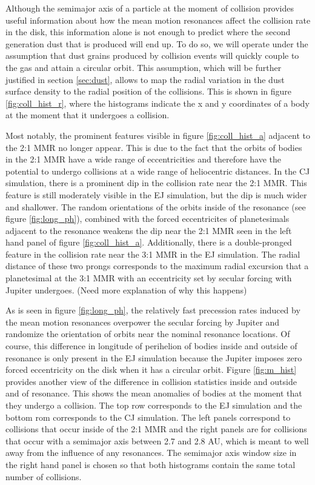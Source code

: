 \documentclass[twocolumn]{aastex63}
\begin{document}
Although the semimajor axis of a particle at the moment of collision provides useful information about how the mean motion 
resonances affect the collision rate in the disk, this information alone is not enough to predict where the second generation dust that 
is produced will end up. To do so, we will operate under the assumption that dust grains produced by collision events will quickly 
couple to the gas and attain a circular orbit. This assumption, which will be further justified in section \ref{sec:dust}, allows to map the 
radial variation in the dust surface density to the radial position of the collisions. This is shown in figure \ref{fig:coll_hist_r}, where the 
histograms indicate the x and y coordinates of a body at the moment that it undergoes a collision.

Most notably, the prominent features visible in figure \ref{fig:coll_hist_a} adjacent to the 2:1 MMR no longer appear. This is due to the 
fact that the orbits of bodies in the 2:1 MMR have a wide range of eccentricities and therefore have the potential to undergo 
collisions at a wide range of heliocentric distances. In the CJ simulation, there is a prominent dip in the collision rate near the 2:1 
MMR. This feature is still moderately visible in the EJ simulation, but the dip is much wider and shallower. The random orientations of 
the orbits inside of the resonance (see figure \ref{fig:long_ph}), combined with the forced eccentricites of planetesimals adjacent to 
the resonance weakens the dip near the 2:1 MMR seen in the left hand panel of figure \ref{fig:coll_hist_a}. Additionally, there is a 
double-pronged feature in the collision rate near the 3:1 MMR in the EJ simulation. The radial distance of these two prongs 
corresponds to the maximum radial excursion that a planetesimal at the 3:1 MMR with an eccentricity set by secular forcing with 
Jupiter undergoes. (Need more explanation of why this happens)

As is seen in figure \ref{fig:long_ph}, the relatively fast precession rates induced by the mean motion resonances overpower the 
secular forcing by Jupiter and randomize the orientation of orbits near the nominal resonance locations. Of course, this difference in 
longitude of perihelion of bodies inside and outside of resonance is only present in the EJ simulation because the Jupiter imposes 
zero forced eccentricity on the disk when it has a circular orbit. Figure \ref{fig:m_hist} provides another view of the difference in 
collision statistics inside and outside and of resonance. This shows the mean anomalies of bodies at the moment that they undergo a 
collision. The top row corresponds to the EJ simulation and the bottom rom corresponds to the CJ simulation. The left panels 
correspond to collisions that occur inside of the 2:1 MMR and the right panels are for collisions that occur with a semimajor axis 
between 2.7 and 2.8 AU, which is meant to well away from the influence of any resonances. The semimajor axis window size in the 
right hand panel is chosen so that both histograms contain the same total number of collisions.
\end{document}
